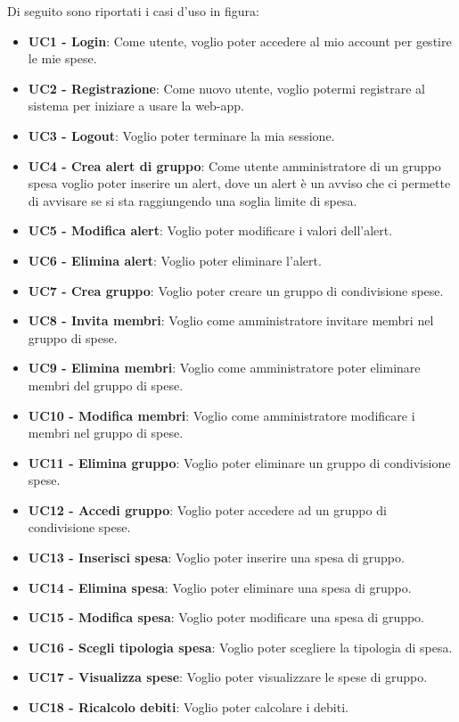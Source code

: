Di seguito sono riportati i casi d'uso in figura:
\begin{itemize}
    \item \textbf{UC1 - Login}: Come utente, voglio poter accedere al mio account per gestire le mie spese.
    \item \textbf{UC2 - Registrazione}: Come nuovo utente, voglio potermi registrare al sistema per iniziare a usare la web-app.
    \item \textbf{UC3 - Logout}: Voglio poter terminare la mia sessione.
    \item \textbf{UC4 - Crea alert di gruppo}: Come utente amministratore di un gruppo spesa voglio poter inserire un alert, dove un alert è un avviso che ci permette di avvisare se si sta raggiungendo una soglia limite di spesa.
    \item \textbf{UC5 - Modifica alert}: Voglio poter modificare i valori dell'alert.
    \item \textbf{UC6 - Elimina alert}: Voglio poter eliminare l'alert.
    \item \textbf{UC7 - Crea gruppo}: Voglio poter creare un gruppo di condivisione spese.
    \item \textbf{UC8 - Invita membri}: Voglio come amministratore invitare membri nel gruppo di spese.
    \item \textbf{UC9 - Elimina membri}: Voglio come amministratore poter eliminare membri del gruppo di spese.
    \item \textbf{UC10 - Modifica membri}: Voglio come amministratore modificare i membri nel gruppo di spese.
    \item \textbf{UC11 - Elimina gruppo}: Voglio poter eliminare un gruppo di condivisione spese.
    \item \textbf{UC12 - Accedi gruppo}: Voglio poter accedere ad un gruppo di condivisione spese.
    \item \textbf{UC13 - Inserisci spesa}: Voglio poter inserire una spesa di gruppo.
    \item \textbf{UC14 - Elimina spesa}: Voglio poter eliminare una spesa di gruppo.
    \item \textbf{UC15 - Modifica spesa}: Voglio poter modificare una spesa di gruppo.
    \item \textbf{UC16 - Scegli tipologia spesa}: Voglio poter scegliere la tipologia di spesa.
    \item \textbf{UC17 - Visualizza spese}: Voglio poter visualizzare le spese di gruppo.
    \item \textbf{UC18 - Ricalcolo debiti}: Voglio poter calcolare i debiti.

\end{itemize}
